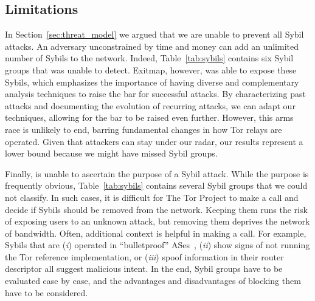 \subsection{Limitations}
\label{sec:limitations}
In Section~\ref{sec:threat_model} we argued that we are unable to prevent all
Sybil attacks.  An adversary unconstrained by time and money can add an
unlimited number of Sybils to the network.  Indeed, Table~\ref{tab:sybils}
contains six Sybil groups that \sys was unable to detect.  Exitmap, however, was
able to expose these Sybils, which emphasizes the importance of having diverse
and complementary analysis techniques to raise the bar for successful attacks.
By characterizing past attacks and documenting the evolution of recurring
attacks, we can adapt our techniques, allowing for the bar to be raised even
further.  However, this arms race is unlikely to end, barring fundamental
changes in how Tor relays are operated.  Given that attackers can stay under our
radar, our results represent a lower bound because we might have missed Sybil
groups.

Finally, \sys is unable to ascertain the purpose of a Sybil attack.  While the
purpose is frequently obvious, Table~\ref{tab:sybils} contains several Sybil
groups that we could not classify.  In such cases, it is difficult for The Tor
Project to make a call and decide if Sybils should be removed from the network.
Keeping them runs the risk of exposing users to an unknown attack, but removing
them deprives the network of bandwidth.  Often, additional context is helpful in
making a call.  For example, Sybils that are (\emph{i}) operated in
``bulletproof'' ASes~\cite{Konte2015a}, (\emph{ii}) show signs of not running
the Tor reference implementation, or (\emph{iii}) spoof information in their
router descriptor all suggest malicious intent.  In the end, Sybil groups have
to be evaluated case by case, and the advantages and disadvantages of blocking
them have to be considered.
